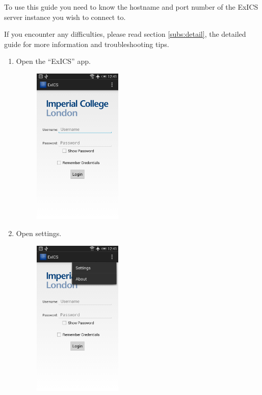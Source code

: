 To use this guide you need to know the hostname and port number of the ExICS server instance you wish to connect to.

If you encounter any difficulties, please read section \ref{subs:detail}, the detailed guide for more information and troubleshooting tips.

\begin{enumerate}

\FloatBarrier

\item Open the ``ExICS'' app.

\begin{figure}[!htbp]
	\centering
	\includegraphics[width=0.4\textwidth]{"screenshots/User guide/1"}
\end{figure}

\FloatBarrier
\clearpage

\FloatBarrier

\item Open settings.

\begin{figure}[!htbp]
	\centering
	\includegraphics[width=0.4\textwidth]{"screenshots/User guide/2"}
\end{figure}


\end{enumerate}
